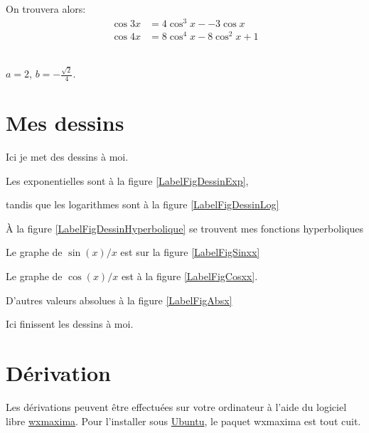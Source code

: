 \noindent On trouvera alors: \[ \begin{array} {rl}
					\cos3x&=4\cos^3x--3\cos x\\
					\cos4x&=8\cos^4x-8\cos^2x+1\end{array}\]


\\
$a=2$, $b=-\frac{\sqrt2}{4}$.


\section{Mes dessins}

Ici je met des dessins à moi.

Les exponentielles sont à la figure \ref{LabelFigDessinExp}, 
\newcommand{\CaptionFigDessinExp}{Des exponentielles}

tandis que les logarithmes sont à la figure \ref{LabelFigDessinLog}
\newcommand{\CaptionFigDessinLog}{Des logarithmes. Aucune des deux ne monte très vite, et plus la base augmente, moins ça monte vite.}


%

À la figure \ref{LabelFigDessinHyperbolique} se trouvent mes fonctions hyperboliques
\newcommand{\CaptionFigDessinHyperbolique}{Des graphiques de fonctions hyperboliques}


Le graphe de $\sin(x)/x$ est sur la figure \ref{LabelFigSinxx}
\newcommand{\CaptionFigSinxx}{La fonction $x\mapsto\frac{ \sin(x) }{ x }$}


Le graphe de $\cos(x)/x$ est à la figure \ref{LabelFigCosxx}.
\newcommand{\CaptionFigCosxx}{La fonction $x\mapsto\frac{ \cos(x) }{ x }$}


D'autres valeurs absolues à la figure \ref{LabelFigAbsx}
\newcommand{\CaptionFigAbsx}{La fonction valeur absolue et quelque autres.}



Ici finissent les dessins à moi.

\section{Dérivation}

Les dérivations peuvent être effectuées sur votre ordinateur à l'aide du logiciel libre \href{http://wxmaxima.sourceforge.net/wiki/index.php/Main_Page}{wxmaxima}. Pour l'installer sous \href{http://www.ubuntu.com}{Ubuntu}, le paquet \og wxmaxima\fg{} est tout cuit.

